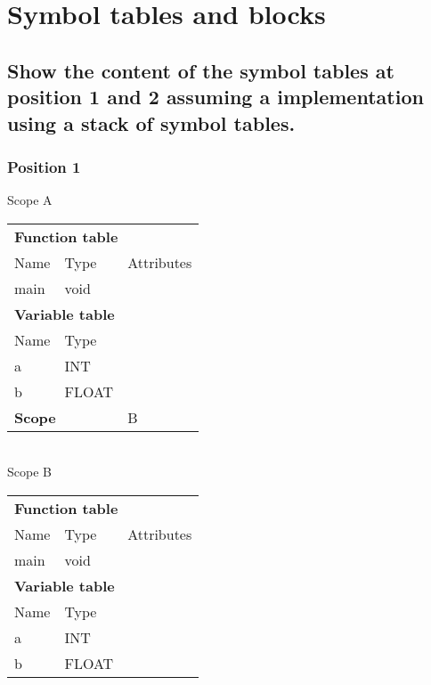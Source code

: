 \section{Symbol tables and blocks}
\subsection{Show the content of the symbol tables at position 1 and 2 assuming a implementation using a stack of symbol tables.}

\subsubsection*{Position 1}
Scope A \\
\begin{tabular}{|l l l|}
	\hline
	\multicolumn{3}{|l|}{\textbf{Function table}} \\
	Name & Type & Attributes	\\
	\hline
	main & void & 			\\
	\hline
	\multicolumn{3}{|l|}{\textbf{Variable table}} \\
	Name & Type &			\\
	\hline
	a & INT &			\\
	b & FLOAT &			\\
	\hline
	\multicolumn{2}{|l}{\textbf{Scope}} & B \\
	\hline
\end{tabular} \\ 
Scope B \\

\begin{tabular}{|l l l|}
	\hline
	\multicolumn{3}{|l|}{\textbf{Function table}} \\
	Name & Type & Attributes	\\
	\hline
	main & void & 			\\
	\hline
	\multicolumn{3}{|l|}{\textbf{Variable table}} \\
	Name & Type &			\\
	\hline
	a & INT &			\\
	b & FLOAT &			\\
	\hline
\end{tabular}

